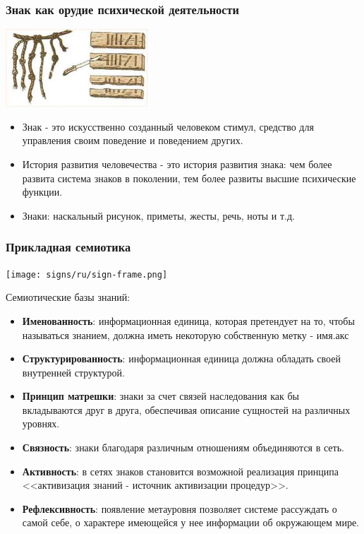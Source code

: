\documentclass[default]{beamer}
\begin{document}
	\begin{frame}
		\frametitle{Знак как орудие психической деятельности}
		\begin{center}
			\includegraphics[width=0.4\textwidth]{link.jpg}
		\end{center}

		\begin{itemize}
			\item Знак - это искусственно созданный человеком стимул, средство для управления своим поведение и поведением других.
			\item История развития человечества - это история развития знака: чем более развита система знаков в поколении, тем более развиты высшие психические функции.
			\item Знаки: наскальный рисунок, приметы, жесты, речь, ноты и т.д.
		\end{itemize}
	\end{frame}

	\begin{frame}
		\frametitle{Прикладная семиотика}
		\begin{center}
			\texttt{[image: signs/ru/sign-frame.png]}
		\end{center}
		\vspace{-15pt}
		\scriptsize
		Семиотические базы знаний:
		\begin{itemize}
			\item \textbf{Именованность}: информационная единица, которая претендует на то, чтобы называться знанием, должна иметь некоторую собственную метку - имя.акс
			\item \textbf{Структурированность}: информационная единица должна обладать своей внутренней структурой.
			\item \textbf{Принцип матрешки}: знаки за счет связей наследования как бы вкладываются друг в друга, обеспечивая описание сущностей на различных уровнях.
			\item \textbf{Связность}: знаки благодаря различным отношениям объединяются в сеть.
			\item \textbf{Активность}: в сетях знаков становится возможной реализация принципа <<активизация знаний - источник активизации процедур>>.
			\item \textbf{Рефлексивность}: появление метауровня позволяет системе рассуждать о самой себе, о характере имеющейся у нее информации об окружающем мире.
		\end{itemize}
		\vspace{-5pt}
		\nocite{*}
		\printbibliography[keyword={apply}, resetnumbers=true]
	\end{frame}
\end{document}
